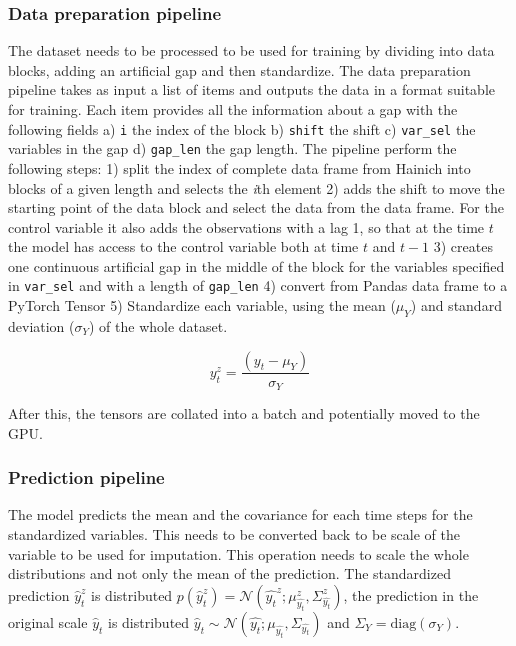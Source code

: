 \documentclass{article}
\newcommand{\norm}[3]{\mathcal{N}\left(#1; #2, #3\right)} %
\begin{document}
\subsubsection{Data preparation pipeline}

The dataset needs to be processed to be used for training by dividing into data blocks, adding an artificial gap and then standardize. The data preparation pipeline takes as input a list of items and outputs the data in a format suitable for training. Each item provides all the information about a gap with the following fields a) \verb|i| the index of the block b) \verb|shift|  the shift c) \verb|var_sel| the variables in the gap d) \verb|gap_len| the gap length. The pipeline perform the following steps: 1) split the index of complete data frame from Hainich into blocks of a given length and selects the \textit{i}th element  2) adds the shift to move the starting point of the data block and select the data from the data frame. For the control variable it also adds the observations with a lag 1, so that at the time $t$ the model has access to the control variable both at time $t$ and $t-1$ 3) creates one continuous artificial gap in the middle of the block for the variables specified in \verb|var_sel| and with a length of \verb|gap_len| 4) convert from Pandas data frame to a PyTorch Tensor 5) Standardize each variable, using the mean ($\mu_Y$) and standard deviation ($\sigma_Y$) of the whole dataset.

\begin{equation}\label{standardized}
    y^z_t = \frac{(y_t - \mu_Y)}{\sigma_Y}
\end{equation}

After this, the tensors are collated into a batch and potentially moved to the GPU.

\subsubsection{Prediction pipeline}

The model predicts the mean and the covariance for each time steps for the standardized variables. This needs to be converted back to be scale of the variable to be used for imputation. This operation needs to scale the whole distributions and not only the mean of the prediction. The standardized prediction $\hat{y}^z_t$ is distributed $p(\hat{y}^z_t) = \norm{\hat{y_t}^z}{\mu^z_{\hat{y_t}}}{\Sigma^z_{\hat{y_t}}}$, the prediction in the original scale $\hat{y}_t$ is distributed $\hat{y}_t \sim \norm{\hat{y_t}}{\mu_{\hat{y_t}}}{\Sigma_{\hat{y_t}}}$ and $\Sigma_Y = \text{diag}(\sigma_Y)$. 
\end{document}
